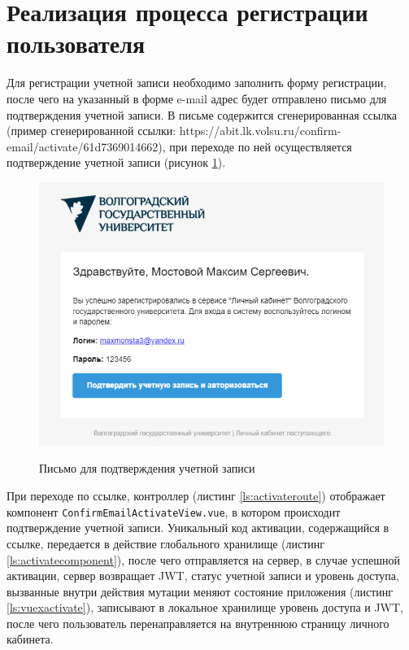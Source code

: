 \section{Реализация процесса регистрации пользователя}

Для регистрации учетной записи необходимо заполнить форму регистрации, после чего на указанный в форме e-mail адрес будет отправлено письмо для подтверждения учетной записи. В письме содержится сгенерированная ссылка (пример сгенерированной ссылки: https://abit.lk.volsu.ru/confirm-email/activate/61d7369014662), при переходе по ней осуществляется подтверждение учетной записи (рисунок \ref{fig:confirmemail}).

\begin{figure}[H]
\begin{center}
\includegraphics[width=0.8\hsize]{fig/confirm-email.png}\\[2mm]
\caption{Письмо для подтверждения учетной записи}\label{fig:confirmemail}
\end{center}
\end{figure}

При переходе по ссылке, контроллер (листинг \ref{ls:activateroute}) отображает компонент \verb|ConfirmEmailActivateView.vue|, в котором происходит подтверждение учетной записи. Уникальный код активации, содержащийся в ссылке, передается в действие глобального хранилище (листинг \ref{ls:activatecomponent}), после чего отправляется на сервер, в случае успешной активации, сервер возвращает JWT, статус учетной записи и уровень доступа, вызванные внутри действия мутации меняют состояние приложения (листинг \ref{ls:vuexactivate}), записывают в локальное хранилище уровень доступа и JWT, после чего пользователь перенаправляется на внутреннюю страницу личного кабинета.

